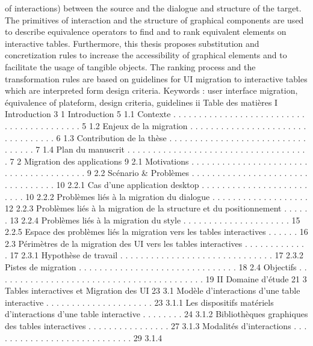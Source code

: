 \documentclass{article}
\begin{document}
of interactions) between the source and the dialogue and structure of the target. The primitives of interaction and
the structure of graphical components are used to describe equivalence operators to ﬁnd and to rank equivalent
elements on interactive tables. Furthermore, this thesis proposes substitution and concretization rules to increase
the accessibility of graphical elements and to facilitate the usage of tangible objects. The ranking process and
the transformation rules are based on guidelines for UI migration to interactive tables which are interpreted
form design criteria.
Keywords :
user interface migration, équivalence of plateform, design criteria, guidelines
ii
Table des matières
I
Introduction
3
1
Introduction
5
1.1
Contexte . . . . . . . . . . . . . . . . . . . . . . . . . . . . . . . . . . . . . . . . .
5
1.2
Enjeux de la migration
. . . . . . . . . . . . . . . . . . . . . . . . . . . . . . . . .
6
1.3
Contribution de la thèse . . . . . . . . . . . . . . . . . . . . . . . . . . . . . . . . .
7
1.4
Plan du manuscrit . . . . . . . . . . . . . . . . . . . . . . . . . . . . . . . . . . . .
7
2
Migration des applications
9
2.1
Motivations . . . . . . . . . . . . . . . . . . . . . . . . . . . . . . . . . . . . . . .
9
2.2
Scénario & Problèmes
. . . . . . . . . . . . . . . . . . . . . . . . . . . . . . . . .
10
2.2.1
Cas d’une application desktop . . . . . . . . . . . . . . . . . . . . . . . . .
10
2.2.2
Problèmes liés à la migration du dialogue . . . . . . . . . . . . . . . . . . .
12
2.2.3
Problèmes liés à la migration de la structure et du positionnement
. . . . . .
13
2.2.4
Problèmes liés à la migration du style . . . . . . . . . . . . . . . . . . . . .
15
2.2.5
Espace des problèmes liés la migration vers les tables interactives . . . . . .
16
2.3
Périmètres de la migration des UI vers les tables interactives
. . . . . . . . . . . . .
17
2.3.1
Hypothèse de travail . . . . . . . . . . . . . . . . . . . . . . . . . . . . . .
17
2.3.2
Pistes de migration . . . . . . . . . . . . . . . . . . . . . . . . . . . . . . .
18
2.4
Objectifs . . . . . . . . . . . . . . . . . . . . . . . . . . . . . . . . . . . . . . . . .
19
II
Domaine d’étude
21
3
Tables interactives et Migration des UI
23
3.1
Modèle d’interactions d’une table interactive
. . . . . . . . . . . . . . . . . . . . .
23
3.1.1
Les dispositifs matériels d’interactions d’une table interactive
. . . . . . . .
24
3.1.2
Bibliothèques graphiques des tables interactives . . . . . . . . . . . . . . . .
27
3.1.3
Modalités d’interactions . . . . . . . . . . . . . . . . . . . . . . . . . . . .
29
3.1.4
\end{document}
